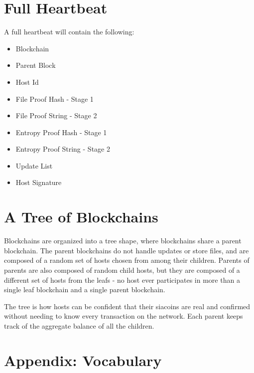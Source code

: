 \documentclass[twocolumn]{article}
\begin{document}

\section{Full Heartbeat}

A full heartbeat will contain the following:

\begin{itemize}
	\item Blockchain
	\item Parent Block
	\item Host Id
	\item File Proof Hash - Stage 1
	\item File Proof String - Stage 2
	\item Entropy Proof Hash - Stage 1
	\item Entropy Proof String - Stage 2
	\item Update List
	\item Host Signature
\end{itemize}

\section{A Tree of Blockchains}

Blockchains are organized into a tree shape, where \childrenperparent{} blockchains share a parent blockchain.
The parent blockchains do not handle updates or store files, and are composed of a random set of hosts chosen from among their children.
Parents of parents are also composed of random child hosts, but they are composed of a different set of hosts from the leafs - no host ever participates in more than a single leaf blockchain and a single parent blockchain.

The tree is how hosts can be confident that their siacoins are real and confirmed without needing to know every transaction on the network.
Each parent keeps track of the aggregate balance of all the children.

\section{Appendix: Vocabulary}
\end{document}
